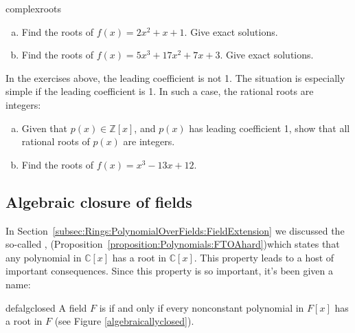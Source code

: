 \begin{exercise}{complexroots}
\begin {enumerate}[(a)]
\item
Find the roots of $f(x)=2x^2+x+1$. Give exact solutions.
\item
Find the roots of $f(x)=5x^3+17x^2+7x+3$. Give exact solutions. 
\end{enumerate}
\end{exercise}
 
In the exercises above, the leading coefficient is not 1. The situation is especially simple if the leading coefficient is 1. In such a case, the rational  roots are integers:

\begin{exercise}{}
\begin{enumerate}[(a)]
\item
Given that $p(x)  \in \mathbb{Z}[x]$, and $p(x)$ has leading coefficient 1, show that all rational roots of $p(x)$ are integers.
\item
Find the roots of $f(x)=x^3-13x+12$.
\end{enumerate}
\end{exercise}


\subsection{Algebraic closure of fields}
\label{subsec:Rings:PolynomialOverFields:ClosureOfField}

In Section~\ref{subsec:Rings:PolynomialOverFields:FieldExtension} we discussed the so-called , (Proposition~\ref{proposition:Polynomials:FTOAhard})which states that any polynomial in $\mathbb{C}[x]$ has a root in $\mathbb{C}[x]$. This property leads to a host of important consequences.  Since this property is so important, it's been given a name:

\begin{defn}{defalgclosed}  
A field $F$ is  if and only if every nonconstant polynomial in $F[x]$ has a root in $F$ (see Figure \ref{algebraicallyclosed}).
\end{defn}

